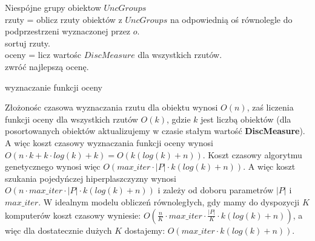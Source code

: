 \documentclass[magisterska]{pracamgr}
\theoremstyle{plain}
\theoremstyle{definition}
\theoremstyle{remark}
\begin{document}
\begin{algorithm}
	{Niespójne grupy obiektow $UncGroups$} \\
  rzuty = oblicz rzuty obiektów z $UncGroups$ na odpowiednią oś równolegle do podprzestrzeni wyznaczonej przez $o$.\\
  sortuj rzuty. \\
  oceny = licz wartośc $DiscMeasure$ dla wszystkich rzutów. \\
  zwróć najlepszą ocenę. \
  \caption{wyznaczanie funkcji oceny}
\end{algorithm}

Złożonośc czasowa wyznaczania rzutu dla obiektu wynosi $O(n)$, zaś liczenia funkcji oceny dla wszystkich rzutów $O(k)$, gdzie $k$ jest liczbą 
obiektów (dla posortowanych obiektów aktualizujemy w czasie stałym wartość \textbf{DiscMeasure}). A więc koszt czasowy wyznaczania funkcji oceny wynosi
$O(n \cdot k + k \cdot log(k) + k) = O(k(log(k) + n))$. Koszt czasowy algorytmu genetycznego wynosi więc 
$O(max\_iter \cdot |P| \cdot k(log(k) + n))$. A więc koszt szukania pojedyńczej hiperplaszczyzny wynosi 
$O(n \cdot max\_iter \cdot |P| \cdot k(log(k) + n))$ i zależy od doboru parametrów $|P|$ i $max\_iter$. W idealnym modelu obliczeń 
   równoległych, gdy mamy do dyspozycji $K$ komputerów koszt czasowy wyniesie:
$O(\frac{n}{K} \cdot max\_iter \cdot \frac{|P|}{K} \cdot k(log(k) + n))$, a więc dla dostatecznie dużych $K$ dostajemy:
$O(max\_iter \cdot k(log(k) + n))$.
   
\end{document}
